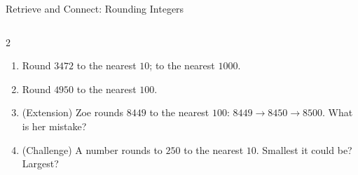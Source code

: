 \documentclass{beamer}
\newcommand{\ashow}[1]{\uncover<2->{\textcolor{red}{\small #1}}}
\begin{document}
\begin{frame}{Retrieve and Connect: Rounding Integers}
\begin{columns}[T]
\begin{multicols}{2}
\begin{enumerate}
  \item Round $3472$ to the nearest $10$; to the nearest $1000$. \ashow{$3470$ and $3000$}

  \columnbreak

  \item Round $4950$ to the nearest $100$. \ashow{$5000$}

  \item (Extension) Zoe rounds $8449$ to the nearest $100$: $8449\to 8450\to 8500$. What is her mistake? \ashow{Rounded twice: only the tens digit $4$ counts, so $8400$}

  \item (Challenge) A number rounds to $250$ to the nearest $10$. Smallest it could be? Largest? \ashow{$245$ and $254$}

\end{enumerate}
\end{multicols}

\end{columns}

\end{frame}
\end{document}
